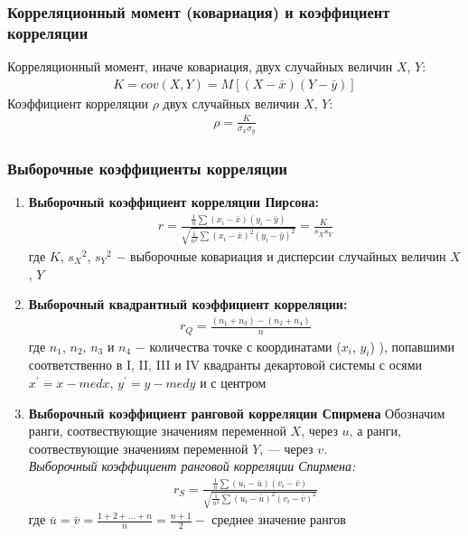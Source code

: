         \subsubsection{Корреляционный момент (ковариация) и коэффициент корреляции}
        Корреляционный момент, иначе ковариация, двух случайных величин $X$, $Y$:
            \begin{gather}
                K = cov(X,Y) = M[(X - \bar{x})(Y - \bar{y})]
            \end{gather}
            Коэффициент корреляции $\rho$ двух случайных величин $X$, $Y$:
            \begin{gather}
                \rho = \frac{K}{\sigma_x\sigma_y}
            \end{gather}
        \subsubsection{Выборочные коэффициенты корреляции}
        \begin{enumerate}
            \item \textbf{Выборочный коэффициент корреляции Пирсона:}
                \begin{gather}
                    r = \frac{\frac{1}{n}\sum(x_i - \bar{x})(y_i - \bar{y})}{\sqrt{\frac{1}{n^2}\sum(x_i - \bar{x})^2(y_i - \bar{y})^2}} = \frac{K}{s_X s_Y}
                \end{gather}
                где $K$, ${s_X}^2$, ${s_Y}^2$ $-$ выборочные ковариация и дисперсии случайных величин $X$, $Y$
            \item \textbf{Выборочный квадрантный коэффициент корреляции:}
            \begin{gather}
                r_Q = \frac{(n_1+n_3) - (n_2+n_4)}{n}
            \end{gather}
            где $n_1$, $n_2$, $n_3$ и $n_4$ $-$ количества точке с координатами ($x_i$, $y_i$) ), попавшими соответственно в I, II, III и IV квадранты декартовой системы с осями $x^{'} = x - medx$, $y^{'} = y - medy$ и с центром 
            \item \textbf{Выборочный коэффициент ранговой корреляции Спирмена}
            Обозначим ранги, соотвествующие значениям переменной $X$, через $u$, а ранги, соотвествующие значениям переменной $Y$, — через $v$.\\
                \textit{Выборочный коэффициент ранговой корреляции Спирмена:}
                \begin{gather}
                    r_S = \frac{\frac{1}{n}\sum(u_i - \bar{u})(v_i - \bar{v})}{\sqrt{\frac{1}{n^2}\sum(u_i - \bar{u})^2(v_i - \bar{v})^2}}
                \end{gather}
                где $\bar{u} = \bar{v} = \frac{1+2+\dots+n}{n} = \frac{n+1}{2} -$ среднее значение рангов
        \end{enumerate}
